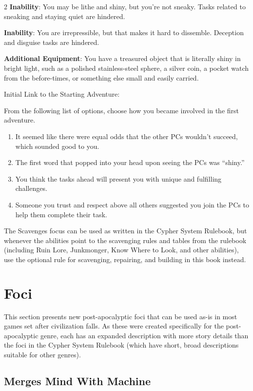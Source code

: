 \begin{multicols}{2}
\textbf{Inability}: You may be lithe and shiny, but you’re not sneaky. Tasks related to sneaking and staying quiet are hindered.

\textbf{Inability}: You are irrepressible, but that makes it hard to dissemble. Deception and disguise tasks are hindered.

\textbf{Additional Equipment}: You have a treasured object that is literally shiny in bright light, such as a polished stainless-steel sphere, a silver coin, a pocket watch from the before-times, or something else small and easily carried.

Initial Link to the Starting Adventure:

From the following list of options, choose how you became involved in the first adventure.

\begin{enumerate}
\item  It seemed like there were equal odds that the other PCs wouldn’t succeed, which sounded good to you.
\item  The first word that popped into your head upon seeing the PCs was “shiny.”
\item  You think the tasks ahead will present you with unique and fulfilling challenges.
\item  Someone you trust and respect above all others suggested you join the PCs to help them complete their task.
\end{enumerate}

The Scavenges focus can be used as written in the Cypher System Rulebook, but whenever the abilities point to the scavenging rules and tables from the rulebook (including Ruin Lore, Junkmonger, Know Where to Look, and other abilities), use the optional rule for scavenging, repairing, and building in this book instead.

\section{Foci}

This section presents new post-apocalyptic foci that can be used as-is in most games set after civilization falls. As these were created specifically for the post-apocalyptic genre, each has an expanded description with more story details than the foci in the Cypher System Rulebook (which have short, broad descriptions suitable for other genres).

\subsection{Merges Mind With Machine}
 

\end{multicols}
